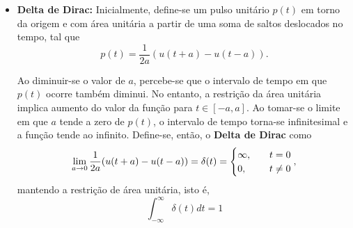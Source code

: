 \documentclass{article}
\numberwithin{equation}{section}
\let\dfr\dfrac
\begin{document}
\begin{itemize}
    \begin{center}
    \end{center}

    \vspace{5mm}

    \item \textbf{Delta de Dirac:} Inicialmente, define-se um pulso unitário $p(t)$ em torno da origem e com área unitária a partir de uma soma de saltos deslocados no tempo, tal que
    \begin{equation}
         p(t) = \dfr{1}{2a}(u(t+a) - u(t-a)). \label{eq:pulso}
    \end{equation}

    Ao diminuir-se o valor de $a$, percebe-se que o intervalo de tempo em que $p(t)$ ocorre também diminui. No entanto, a restrição da área unitária implica aumento do valor da função para $t \in [-a,a]$. Ao tomar-se o limite em que $a$ tende a zero de $p(t)$, o intervalo de tempo torna-se infinitesimal e a função tende ao infinito.
    Define-se, então, o \textbf{Delta de Dirac} como
    \begin{equation}
        \operatornamewithlimits{lim}_{a \to 0} \dfr{1}{2a}(u(t+a) - u(t-a)) = \delta(t) =
        \begin{cases}
            \infty, &\quad t=0 \\
            0, &\quad t\neq 0 \\
        \end{cases}, \label{eq:dirac_def}
    \end{equation}
    \noindent mantendo a restrição de área unitária, isto é,
    \begin{equation}
            \displaystyle{\int_{-\infty}^{\infty}{\delta(t)dt}} = 1 \label{eq:dirac_int}
    \end{equation}


\end{itemize}
\end{document}
